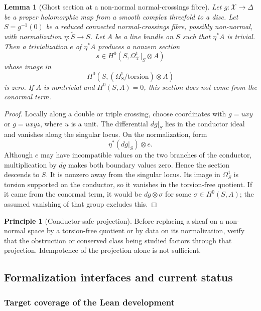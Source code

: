 \documentclass[11pt,reqno]{amsart}
\numberwithin{equation}{section}
\newtheorem{lemma}[theorem]{Lemma}
\theoremstyle{definition}
\newtheorem{principle}[theorem]{Principle}
\begin{document}
\begin{lemma}[Ghost section at a non-normal normal-crossings fibre]\label{lem:ghost}
Let $g:\mathcal X\to\Delta$ be a proper holomorphic map from a smooth complex threefold to a disc. Let $S=g^{-1}(0)$ be a reduced connected normal-crossings fibre, possibly non-normal, with normalization $\eta:\widetilde S\to S$. Let $A$ be a line bundle on $S$ such that $\eta^*A$ is trivial. Then a trivialization $e$ of $\eta^*A$ produces a nonzero section
\[
s\in H^0(S,\Omega^1_{\mathcal X}|_S\otimes A)
\]
whose image in
\[
H^0(S,(\Omega_S^1/\mathrm{torsion})\otimes A)
\]
is zero. If $A$ is nontrivial and $H^0(S,A)=0$, this section does not come from the conormal term.
\end{lemma}

\begin{proof}
Locally along a double or triple crossing, choose coordinates with $g=uxy$ or $g=uxyz$, where $u$ is a unit. The differential $dg|_S$ lies in the conductor ideal and vanishes along the singular locus. On the normalization, form
\[
\eta^*(dg|_S)\otimes e.
\]
Although $e$ may have incompatible values on the two branches of the conductor, multiplication by $dg$ makes both boundary values zero. Hence the section descends to $S$. It is nonzero away from the singular locus. Its image in $\Omega_S^1$ is torsion supported on the conductor, so it vanishes in the torsion-free quotient. If it came from the conormal term, it would be $dg\otimes\sigma$ for some $\sigma\in H^0(S,A)$; the assumed vanishing of that group excludes this.
\end{proof}

\begin{principle}[Conductor-safe projection]\label{pr:conductor-safe}
Before replacing a sheaf on a non-normal space by a torsion-free quotient or by data on its normalization, verify that the obstruction or conserved class being studied factors through that projection. Idempotence of the projection alone is not sufficient.
\end{principle}

\subsection{Formalization interfaces and current status}\label{sec:formalization}

\subsubsection{Target coverage of the Lean development}
\end{document}
